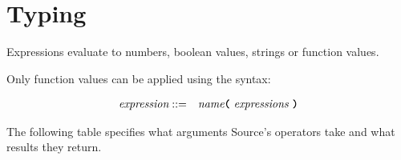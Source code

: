 
\section*{Typing}

Expressions evaluate to numbers, boolean values, strings or function values. 

Only function values can be applied using the syntax:

\begin{eqnarray*}
 \textit{expression}    
                                   & ::=   &  \textit{name}
                                               \texttt{\textbf{(}}\  \textit{expressions} \
                                               \texttt{\textbf{)}}\\ 
\end{eqnarray*}

The following table specifies what arguments Source's operators
take and what results they return.

